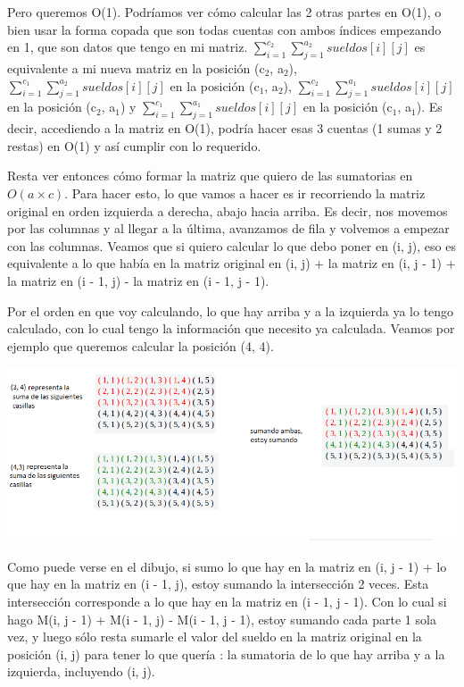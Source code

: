 Pero queremos O(1). Podríamos ver cómo calcular las 2 otras partes en O(1), o bien usar la forma copada que son todas cuentas con ambos índices empezando en 1, que son datos que tengo en mi matriz. $\sum_{i = 1}^{c_2} \sum_{j = 1}^{a_2} sueldos[i][j]$ es equivalente a mi nueva matriz en la posición (c$_2$, a$_2$), $\sum_{i = 1}^{c_1} \sum_{j = 1}^{a_2} sueldos[i][j]$ en la posición (c$_1$, a$_2$), $\sum_{i = 1}^{c_2} \sum_{j = 1}^{a_1} sueldos[i][j]$ en la posición (c$_2$, a$_1$) y $\sum_{i = 1}^{c_1} \sum_{j = 1}^{a_1} sueldos[i][j]$ en la posición (c$_1$, a$_1$). Es decir, accediendo a la matriz en O(1), podría hacer esas 3 cuentas (1 sumas y 2 restas) en O(1) y así cumplir con lo requerido.  \newline

Resta ver entonces cómo formar la matriz que quiero de las sumatorias en $O(a \times c)$. Para hacer esto, lo que vamos a hacer es ir recorriendo la matriz original en orden izquierda a derecha, abajo hacia arriba. Es decir, nos movemos por las columnas y al llegar a la última, avanzamos de fila y volvemos a empezar con las columnas. Veamos que si quiero calcular lo que debo poner en (i, j), eso es equivalente a lo que había en la matriz original en (i, j) + la matriz en (i, j - 1) + la matriz en (i - 1, j) - la matriz en (i - 1, j - 1).  \newline

Por el orden en que voy calculando, lo que hay arriba y a la izquierda ya lo tengo calculado, con lo cual tengo la información que necesito ya calculada. Veamos por ejemplo que queremos calcular la posición (4, 4).

\includegraphics[scale=0.5]{img/tabla.jpg}

Como puede verse en el dibujo, si sumo lo que hay en la matriz en (i, j - 1) + lo que hay en la matriz en (i - 1, j), estoy sumando la intersección 2 veces. Esta intersección corresponde a lo que hay en la matriz en (i - 1, j - 1). Con lo cual si hago M(i, j - 1) + M(i - 1, j) - M(i - 1, j - 1), estoy sumando cada parte 1 sola vez, y luego sólo resta sumarle el valor del sueldo en la matriz original en la posición (i, j) para tener lo que quería : la sumatoria de lo que hay arriba y a la izquierda, incluyendo (i, j). \newline

